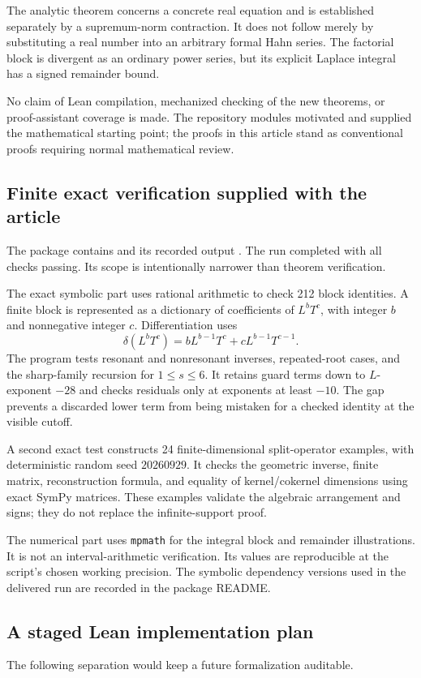 \documentclass[11pt,a4paper]{article}
\numberwithin{equation}{section}
\theoremstyle{definition}
\theoremstyle{remark}
\begin{document}
The analytic theorem concerns a concrete real equation and is established separately by a supremum-norm contraction. It does not follow merely by substituting a real number into an arbitrary formal Hahn series. The factorial block is divergent as an ordinary power series, but its explicit Laplace integral has a signed remainder bound.

No claim of Lean compilation, mechanized checking of the new theorems, or proof-assistant coverage is made. The repository modules motivated and supplied the mathematical starting point; the proofs in this article stand as conventional proofs requiring normal mathematical review.

\subsection{Finite exact verification supplied with the article}
The package contains  and its recorded output . The run completed with all checks passing. Its scope is intentionally narrower than theorem verification.

The exact symbolic part uses rational arithmetic to check 212 block identities. A finite block is represented as a dictionary of coefficients of $L^bT^c$, with integer $b$ and nonnegative integer $c$. Differentiation uses
\[
 \delta(L^bT^c)=bL^{b-1}T^c+cL^{b-1}T^{c-1}.
\]
The program tests resonant and nonresonant inverses, repeated-root cases, and the sharp-family recursion for $1\le s\le6$. It retains guard terms down to $L$-exponent $-28$ and checks residuals only at exponents at least $-10$. The gap prevents a discarded lower term from being mistaken for a checked identity at the visible cutoff.

A second exact test constructs 24 finite-dimensional split-operator examples, with deterministic random seed $20260929$. It checks the geometric inverse, finite matrix, reconstruction formula, and equality of kernel/cokernel dimensions using exact SymPy matrices. These examples validate the algebraic arrangement and signs; they do not replace the infinite-support proof.

The numerical part uses \texttt{mpmath} for the integral block and remainder illustrations. It is not an interval-arithmetic verification. Its values are reproducible at the script's chosen working precision. The symbolic dependency versions used in the delivered run are recorded in the package README.

\subsection{A staged Lean implementation plan}
The following separation would keep a future formalization auditable.
\end{document}
